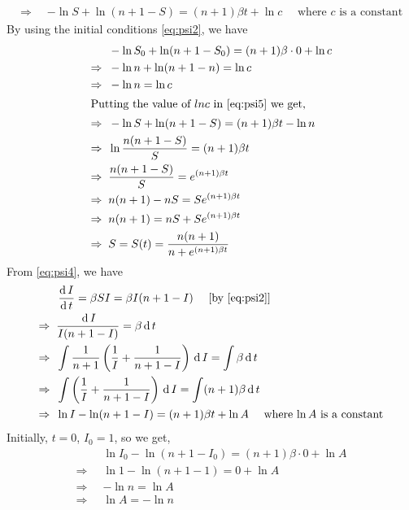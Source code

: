 \documentclass[../main-sheet.tex]{subfiles}
\begin{document}
\begin{soln}
\begin{align}
        \Rightarrow\;\;& -\ln{S}+\ln({n+1-S})=(n+1)\beta t+\ln c\quad\text{ where \(c\) is a constant}\label{eq:psi5}
    \end{align}
    By using the initial conditions \eqref{eq:psi2}, we have
    \begin{align}
        & -\ln{S_0}+\ln({n+1-S_0})=(n+1)\beta\cdot0+\ln c\notag\\
        \Rightarrow\;\;& -\ln n+\ln({n+1-n})=\ln c\notag\\
        \Rightarrow\;\;& -\ln n=\ln c\notag\\
        \intertext{Putting the value of \(ln c\) in \eqref{eq:psi5} we get,}
        \Rightarrow\;\;& -\ln{S}+\ln({n+1-S})=(n+1)\beta t-\ln n\notag\\
        \Rightarrow\;\;& \ln\frac{n(n+1-S)}{S}=(n+1)\beta t\notag\\
        \Rightarrow\;\;& \frac{n(n+1-S)}{S}=e^{(n+1)\beta t}\notag\\
        \Rightarrow\;\;& {n(n+1)-nS}=Se^{(n+1)\beta t}\notag\\
        \Rightarrow\;\;& {n(n+1)}=nS+Se^{(n+1)\beta t}\notag\\
        \Rightarrow\;\;& S=S(t)=\frac{n(n+1)}{n+e^{(n+1)\beta t}}\label{eq:psi6}
    \end{align}
    From \eqref{eq:psi4}, we have
    \begin{align}
        &\,\frac{\mathrm{d}\,I}{\mathrm{d}\,t}=\beta SI=\beta I(n+1-I)\quad \text{ [by \eqref{eq:psi2}]}\notag\\
        \Rightarrow\;\;&\frac{\,\mathrm{d}\, I}{I(n+1-I)}=\beta \,\mathrm{d}\, t\notag\\
        \Rightarrow\;\;&\int\frac{1}{n+1}\left( \frac{1}{I}+\frac{1}{n+1-I} \right)\,\mathrm{d}\, I=\int \beta \,\mathrm{d}\, t\notag\\
        \Rightarrow\;\;&\int\left( \frac{1}{I}+\frac{1}{n+1-I} \right)\,\mathrm{d}\, I=\int(n+1) \beta \,\mathrm{d}\, t\notag\\
        \Rightarrow\;\;&\ln {I}-\ln ({n+1-I}) =(n+1) \beta t+\ln A\label{eq:psi7}\quad\text{ where \(\ln A\) is a constant}
    \end{align}
    Initially, \(t=0\), \(I_0=1\), so we get,
    \begin{align*}
        &\ln {I_0}-\ln ({n+1-I_0}) =(n+1) \beta \cdot 0+\ln A\\
        \Rightarrow\;\;&\ln 1-\ln ({n+1-1}) =0+\ln A\\
        \Rightarrow\;\;&-\ln n =\ln A\\
        \Rightarrow\;\;&\ln A =-\ln n
    \end{align*}

\end{soln}
\end{document}
